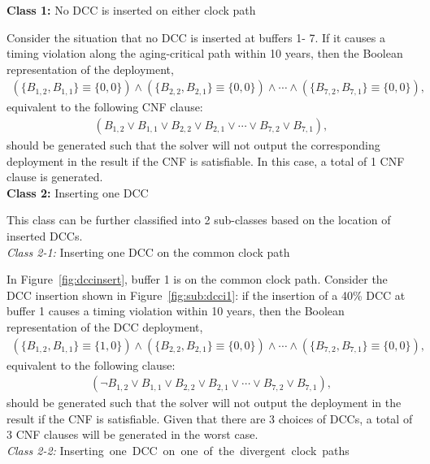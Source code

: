\noindent \textbf{Class 1:} No DCC is inserted on either clock path

Consider the situation that no DCC is inserted at buffers 1- 7. If it causes a timing violation along the aging-critical path within 10 years, then the Boolean representation of the deployment,
{\fontsize{9}{10}
\begin{gather*}
\left(\{B_{1,2}, B_{1,1}\} \equiv \{0, 0\} \right) \land \left( \{B_{2,2}, B_{2,1}\} \equiv \{0, 0\} \right) \land \dotsb 
\land \left( \{B_{7,2}, B_{7,1}\} \equiv \{0, 0\} \right),
\end{gather*}}
equivalent to the following CNF clause:
{\fontsize{9}{10}
\begin{gather*}
\left(B_{1,2} \lor B_{1,1} \lor B_{2,2} \lor B_{2,1} \lor \dotsb \lor B_{7,2} \lor B_{7,1} \right),
\end{gather*}}
should be generated such that the solver will not output the corresponding deployment in the result if the CNF is satisfiable. In this case, a total of 1 CNF clause is generated.\\

\noindent \textbf{Class 2:} Inserting one DCC

This class can be further classified into 2 sub-classes based on the location of inserted DCCs. \\
\textit{Class 2-1:} Inserting one DCC on the common clock path

In Figure~\ref{fig:dccinsert}, buffer 1 is on the common clock path. Consider the DCC insertion shown in Figure~\ref{fig:sub:dcci1}: if the insertion of a 40\% DCC at buffer 1 causes a timing violation within 10 years, then the Boolean representation of the DCC deployment,
{\fontsize{9}{10}
\begin{gather*}
\left(\{B_{1,2}, B_{1,1}\} \equiv \{1, 0\} \right) \land \left( \{B_{2,2}, B_{2,1}\} \equiv \{0, 0\} \right) \land \dotsb 
\land \left( \{B_{7,2}, B_{7,1}\} \equiv \{0, 0\} \right),
\end{gather*}}equivalent to the following clause:
{\fontsize{9}{10}
\begin{gather*}
\left(\neg B_{1,2} \lor B_{1,1} \lor B_{2,2} \lor B_{2,1} \lor \dotsb \lor B_{7,2} \lor B_{7,1} \right),
\end{gather*}}should be generated such that the solver will not output the deployment in the result if the CNF is satisfiable. Given that there are 3 choices of DCCs, a total of 3 CNF clauses will be generated in the worst case. \\
\textit{Class 2-2:} \mbox{\fontsize{9}{10.8}\selectfont Inserting one DCC on one of the divergent clock paths}

